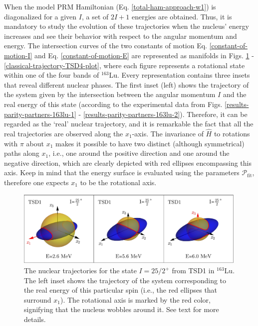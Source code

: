 When the model PRM Hamiltonian (Eq. \ref{total-ham-approach-w1}) is diagonalized for a given $I$, a set of $2I+1$ energies are obtained. Thus, it is mandatory to study the evolution of these trajectories when the nucleus' energy increases and see their behavior with respect to the angular momentum and energy. The intersection curves of the two constants of motion Eq. \ref{constant-of-motion-I} and Eq. \ref{constant-of-motion-E} are represented as manifolds in Figs. \ref{classical-trajectory-TSD1-plot} - \ref{classical-trajectory-TSD4-plot}, where each figure represents a rotational state within one of the four bands of $^{163}$Lu. Every representation contains three insets that reveal different nuclear phases. The first inset (left) shows the trajectory of the system given by the intersection between the angular momentum $I$ and the real energy of this state (according to the experimental data from Figs. \ref{results-parity-partners-163lu-1} - \ref{results-parity-partners-163lu-2}). Therefore, it can be regarded as the `real' nuclear trajectory, and it is remarkable the fact that all the real trajectories are observed along the $x_1$-axis. The invariance of $\hat{H}$ to rotations with $\pi$ about $x_1$ makes it possible to have two distinct (although symmetrical) paths along $x_1$, i.e., one around the positive direction and one around the negative direction, which are clearly depicted with red ellipses encompassing this axis. Keep in mind that the energy surface is evaluated using the parameters $\mathcal{P}_\text{fit}$, therefore one expects $x_1$ to be the rotational axis.
\begin{figure}
    \centering
    \includegraphics[width=0.99\textwidth]{Chapters/Figures/parity-partners-plots/classical-trajectory-TSD1.pdf}
    \caption{The nuclear trajectories for the state $I=25/2^+$ from TSD1 in $^{163}$Lu. The left inset shows the trajectory of the system corresponding to the real energy of this particular spin (i.e., the red ellipses that surround $x_1$). The rotational axis is marked by the red color, signifying that the nucleus wobbles around it. See text for more details.}
    \label{classical-trajectory-TSD1-plot}
\end{figure}
